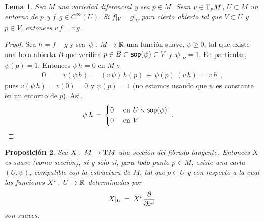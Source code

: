 \theoremstyle{plain}
\newtheorem{lemaNotasSueltasGermenes}{Lema}[section]
\newtheorem{propoSuavidadCampos}[lemaNotasSueltasGermenes]{Proposici\'{o}n}
\newtheorem{propoEquivalenciaSuavidadCampos}[lemaNotasSueltasGermenes]%
	{Proposici\'{o}n}
\newtheorem{propoSuavidadFormas}[lemaNotasSueltasGermenes]{Proposici\'{o}n}
\newtheorem{propoEquivalenciaSuavidadFormas}[lemaNotasSueltasGermenes]%
	{Proposici\'{o}n}

\theoremstyle{remark}
\newtheorem{obsBaseEnElCotangente}[lemaNotasSueltasGermenes]{Observaci\'{o}n}


\begin{lemaNotasSueltasGermenes}\label{lema:notassueltasgermenes}
	Sea $M$ una variedad diferencial y sea $p\in M$. Sean
	$v\in\tangente[p]{M}$, $U\subset M$ un entorno de $p$ y
	$f,g\in C^\infty(U)$. Si $f|_V=g|_V$ para cierto abierto tal que
	$V\subset U$ y $p\in V$, entonces $v\,f=v\,g$.
\end{lemaNotasSueltasGermenes}

\begin{proof}
	Sea $h=f-g$ y sea $\psi:\,M\rightarrow\mathbb{R}$ una funci\'{o}n
	suave, $\psi\geq 0$, tal que existe una bola abierta $B$ que verifica
	$p\in B\subset\mathsf{sop}(\psi)\subset V$ y $\psi|_B=1$. En particular,
	$\psi(p)=1$. Entonces $\psi\,h=0$ en $M$ y
	\begin{align*}
		0 & \,=\,v(\psi\,h)\,=\,(v\,\psi)\,h(p)\,+\,
			\psi(p)\,(v\,h)\,=\,v\,h
		\text{ ,}
	\end{align*}
	pues $v(\psi\,h)=v(0)=0$ y $\psi(p)=1$ (no estamos usando que $\psi$
	es constante en un entorno de $p$). As\'{\i},
	\begin{align*}
		\psi\,h & \,=\,
			\begin{cases}
				0 & \text{ en } U\smallsetminus\mathsf{sop}(\psi) \\
				0 & \text{ en } V
			\end{cases}
		\text{ .}
	\end{align*}
\end{proof}

\begin{propoSuavidadCampos}\label{propo:suavidadcampos}
	Sea $X:\,M\rightarrow\tangente{M}$ una secci\'{o}n del fibrado
	tangente. Entonces $X$ es suave (como secci\'{o}n), si y s\'{o}lo si,
	para todo punto $p\in M$, existe una carta $(U,\psi)$, compatible con
	la estructura de $M$, tal que $p\in U$ y con respecto a la cual las
	funciones $X^i:\,U\rightarrow\mathbb{R}$ determinadas por
	\begin{equation}\label{eq:suavidadcampos}
		X|_U \,=\,X^i\,\gancho{x^i}
	\end{equation}
	son suaves.
\end{propoSuavidadCampos}

